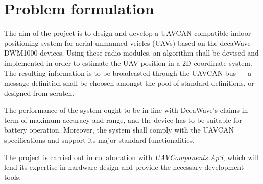 \section{Problem formulation}\label{sec:problem_formulation}

The aim of the project is to design and develop a UAVCAN-compatible indoor positioning system for aerial unmanned veicles (UAVs) based on the decaWave DWM1000 devices.
Using these radio modules, an algorithm shall be devised and implemented in order to estimate the UAV position in a 2D coordinate system.
The resulting information is to be broadcasted through the UAVCAN bus --- a message definition shall be choosen amongst the pool of standard definitions, or designed from scratch.

The performance of the system ought to be in line with DecaWave's claims in term of maximum accuracy and range, and the device has to be suitable for battery operation.
Moreover, the system shall comply with the UAVCAN specifications and support its major standard functionalities.

The project is carried out in collaboration with \emph{UAVComponents ApS}, which will lend its expertise in hardware design and provide the necessary development tools.
